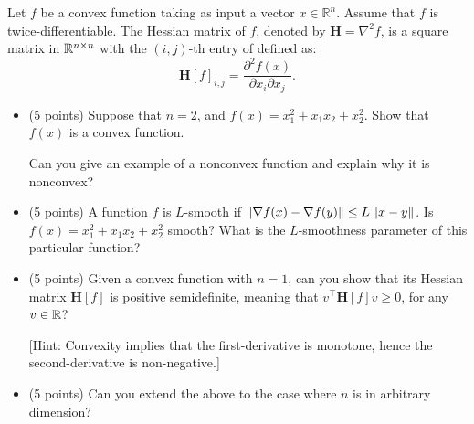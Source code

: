 \documentclass[11pt]{article}
\begin{document}
Let $f$ be a convex function taking as input a vector $x\in \mathbb{R}^n$.
Assume that $f$ is twice-differentiable.
The Hessian matrix of $f$, denoted by $\mathbf{H} = \nabla^2 f$, is a square matrix in $\mathbb{R}^{n\times n}$ with the $(i,j)$-th entry of defined as:
\[ \mathbf{H}[f]_{i,j} = \frac{\partial^2 f(x)}{\partial x_i \partial x_j}. \]
\begin{itemize}
    \item (5 points) Suppose that $n = 2$, and $f(x) = x_1^2 + x_1 x_2 + x_2^2$. Show that $f(x)$ is a convex function.

    Can you give an example of a nonconvex function and explain why it is nonconvex?

    \item (5 points) A function $f$ is $L$-smooth if $\left\| \nabla f(x) - \nabla f(y) \right\| \le L \left\| x - y \right\|$. Is $f(x) = x_1^2 + x_1 x_2 + x_2^2$ smooth? What is the $L$-smoothness parameter of this particular function?

    \item (5 points) Given a convex function with $n = 1$, can you show that its Hessian matrix $\mathbf{H}[f]$ is positive semidefinite, meaning that $v^{\top} \mathbf{H}[f] v \ge 0$, for any $v \in \mathbb{R}$?

    [Hint: Convexity implies that the first-derivative is monotone, hence the second-derivative is non-negative.]

    \item (5 points) Can you extend the above to the case where $n$ is in arbitrary dimension?
\end{itemize}

\newpage
\end{document}

